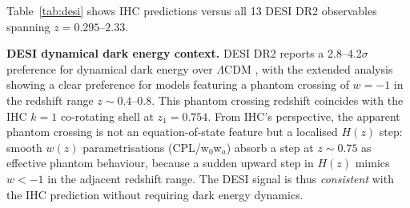 \documentclass[12pt,a4paper]{article}
\begin{document}
Table~\ref{tab:desi} shows IHC predictions versus all 13 DESI DR2 observables
\citep{DESI2025} spanning $z = 0.295$--$2.33$.

\textbf{DESI dynamical dark energy context.} DESI DR2 reports a 2.8--4.2$\sigma$ preference
for dynamical dark energy over $\Lambda$CDM \citep{DESI2025}, with the extended analysis
\citep{DESIext2025} showing a clear preference for models featuring a phantom crossing of
$w = -1$ in the redshift range $z \sim 0.4$--$0.8$. This phantom crossing redshift
coincides with the IHC $k=1$ co-rotating shell at $z_1 = 0.754$. From IHC's perspective,
the apparent phantom crossing is not an equation-of-state feature but a localised
$H(z)$ step: smooth $w(z)$ parametrisations (CPL/w$_0$w$_a$) absorb a step at $z \sim 0.75$
as effective phantom behaviour, because a sudden upward step in $H(z)$ mimics
$w < -1$ in the adjacent redshift range. The DESI signal is thus
\emph{consistent} with the IHC prediction without requiring dark energy dynamics.
\end{document}
